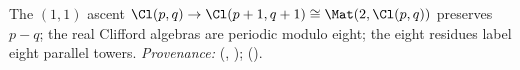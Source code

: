 The $(1,1)$ ascent $\Cl(p,q) \to \Cl(p+1,q+1) \cong \Mat(2, \Cl(p,q))$ preserves $p - q$; the real Clifford algebras are periodic modulo eight; the eight residues label eight parallel towers. \emph{Provenance:} \cite[Thms.~3.2 and 3.6]{ButlerT3} (, ); \cite[Fact~2.5]{ButlerT14} ().
